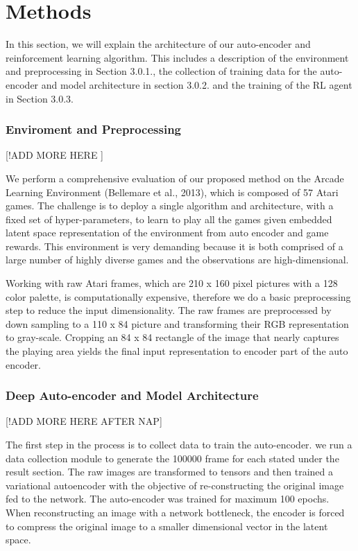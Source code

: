 \chapter{Methods }

In this section, we will explain the architecture of our auto-encoder and reinforcement learning algorithm. 
This includes a description of the environment and preprocessing  
in Section 3.0.1., 
the collection of training data for the auto-encoder and model architecture in section 
3.0.2. and the training of the RL agent in Section  3.0.3.


\subsection{Enviroment and Preprocessing}
[!ADD MORE HERE ]

We perform a comprehensive evaluation of our 
proposed method on the Arcade Learning Environment (Bellemare et al., 2013), 
which is composed of 57 Atari games. 
The challenge is to deploy a single algorithm and architecture, 
with a fixed set of hyper-parameters, 
to learn to play all the games given embedded latent space 
representation of the environment from auto encoder and game rewards. 
This environment is very demanding because it is both 
comprised of a large number of highly diverse games and the observations are high-dimensional.

Working with raw Atari frames, 
which are 210 x 160 pixel pictures with a 
128 color palette, is computationally expensive, therefore we do a 
basic preprocessing step to reduce the input dimensionality. 
The raw frames are preprocessed by down sampling to a 110 x 84 
picture and transforming their RGB representation to gray-scale.
Cropping an 84 x 84 rectangle of the image that nearly 
captures the playing area yields the final input representation to encoder part of the auto encoder.


\subsection{Deep Auto-encoder and Model Architecture}
[!ADD MORE HERE AFTER NAP]

The first step in the process is to collect data to train the auto-encoder. 
we run a data collection module to generate the 100000 frame 
for each stated under the result section.
The raw images are transformed to tensors and then trained a variational autoencoder 
with the objective of re-constructing the original image fed to the network. 
The auto-encoder was trained for maximum  100 epochs.
When reconstructing an image with a network bottleneck, 
the encoder is forced to compress the original image to a smaller dimensional vector in the latent space.

